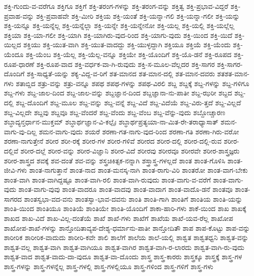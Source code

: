 {ಶಕ್ತಿ-ಗುಂದು-ವ-ವರೆಗೂ
ಶಕ್ತಿಗೂ
ಶಕ್ತಿಗೆ
ಶಕ್ತಿ-ತರಂಗ-ಗಳನ್ನು
ಶಕ್ತಿ-ತರಂಗ-ವನ್ನು
ಶಕ್ತಿತ್ವ
ಶಕ್ತಿ-ಪ್ರಭಾವ-ವಿದ್ದರೆ
ಶಕ್ತಿ-ಪ್ರವಾಹ-ವನ್ನು
ಶಕ್ತಿ-ಪ್ರವಾಹವೇ
ಶಕ್ತಿ-ಮೀರಿ
ಶಕ್ತಿಯ
ಶಕ್ತಿ-ಯಂತೆ
ಶಕ್ತಿ-ಯನ್ನಾ-ಗಲಿ
ಶಕ್ತಿ-ಯನ್ನಾ-ಗಲೀ
ಶಕ್ತಿ-ಯನ್ನು
ಶಕ್ತಿ-ಯನ್ನೂ
ಶಕ್ತಿ-ಯನ್ನೆಲ್ಲ
ಶಕ್ತಿ-ಯನ್ನೆಲ್ಲಾ
ಶಕ್ತಿ-ಯನ್ನೇ
ಶಕ್ತಿ-ಯನ್ನೇನೋ
ಶಕ್ತಿ-ಯಲ್ಲ
ಶಕ್ತಿ-ಯಲ್ಲಿ
ಶಕ್ತಿ-ಯಲ್ಲೆಲ್ಲ
ಶಕ್ತಿಯಾ
ಶಕ್ತಿ-ಯಾ-ಗಲೀ
ಶಕ್ತಿ-ಯಾಗಿ
ಶಕ್ತಿ-ಯಾಗಿರು-ವುದ-ರಿಂದ
ಶಕ್ತಿ-ಯಾಗು-ವುದು
ಶಕ್ತಿ-ಯಿಂದ
ಶಕ್ತಿ-ಯಿದೆ
ಶಕ್ತಿ-ಯಿಲ್ಲದ
ಶಕ್ತಿಯು
ಶಕ್ತಿ-ಯುತ-ವಾಗಿ
ಶಕ್ತಿ-ಯುತ-ವಾದದ್ದು
ಶಕ್ತಿ-ಯುಳ್ಳದ್ದಾಗಿ
ಶಕ್ತಿಯೂ
ಶಕ್ತಿಯೆ
ಶಕ್ತಿ-ಯೆಂದು
ಶಕ್ತಿ-ಯೆಂದೂ
ಶಕ್ತಿ-ಯೆಂಬ
ಶಕ್ತಿ-ಯೆಲ್ಲ
ಶಕ್ತಿ-ಯೆಲ್ಲ-ವನ್ನೂ
ಶಕ್ತಿಯೇ
ಶಕ್ತಿ-ಯೊಂದಿಗೆ
ಶಕ್ತಿ-ಯೊ-ಡನೆ
ಶಕ್ತಿ-ರೂಪದ
ಶಕ್ತಿ-ರೂಪ-ಧಾರಣೆ
ಶಕ್ತಿ-ರೂಪ-ವಾದ
ಶಕ್ತಿ-ವರ್ಧಕ-ವಾ-ಗಿ-ರುವುದು
ಶಕ್ತಿ-ಸ-ಮೂಲ-ವೆಲ್ಲದರ
ಶಕ್ತಿ-ಸಾಗರ
ಶಕ್ತಿ-ಸಾಗರ-ದೊಂದಿಗೆ
ಶಕ್ತಿ-ಸಾಧ್ಯತೆ-ಯನ್ನು
ಶಕ್ಯ-ವಿದ್ದ-ವ-ರಿಗೆ
ಶತ-ಮಾನದ
ಶತ-ಮಾನ-ದಲ್ಲಿ
ಶತ-ಮಾನ-ದವರು
ಶತಶತ-ಮಾನ-ಗಳು
ಶತಾಬ್ದಿದ
ಶತ್ರು-ವನ್ನು
ಶತ್ರು-ವನ್ನೂ
ಶಪಥ
ಶಪಥ-ಗಳನ್ನು
ಶಪಥ-ವಿರಲಿ
ಶಬ್ದ
ಶಬ್ದಕ್ಕೆ
ಶಬ್ದ-ಗಳನ್ನು
ಶಬ್ದ-ಗಳಿಗೂ
ಶಬ್ದ-ಗಳು
ಶಬ್ದ-ಜಾಲ-ದಿಂದ
ಶಬ್ದ-ಜಾಲ-ವನ್ನು
ಶಬ್ದಜ್ಞಾನ-ದಿಂದ
ಶಬ್ದಜ್ಞಾನಾ-ನು-ಪಾತೀ
ಶಬ್ದ-ಝರೀ
ಶಬ್ದದ
ಶಬ್ದ-ದಲ್ಲಿ
ಶಬ್ದ-ದೊಂದಿಗೆ
ಶಬ್ದ-ಮೂಲ
ಶಬ್ದ-ವನ್ನು
ಶಬ್ದ-ವನ್ನೆ
ಶಬ್ದ-ವಿದೆ
ಶಬ್ದ-ವಿದೆಯೆ
ಶಬ್ದ-ವಿರು-ತ್ತದೆ
ಶಬ್ದ-ವಿಲ್ಲದೆ
ಶಬ್ದ-ವಿಲ್ಲದೇ
ಶಬ್ದವು
ಶಬ್ದವೂ
ಶಬ್ದ-ವೆಂದರೆ
ಶಬ್ದ-ವೆಂದು
ಶಬ್ದ-ವೆಂಬ
ಶಬ್ದ-ವೆನ್ನು-ವುದು
ಶಬ್ದೋಚ್ಚಾರಣ
ಶಬ್ಧಾದ್ಯನ್ತರ್ಧಾನ-ಮುಕ್ತಮ್
ಶಬ್ಧಾರ್ಥಜ್ಞಾನ-ವಿ-ಕಲ್ಪೈಃ
ಶಬ್ಧಾರ್ಥಪ್ರತ್ಯಯಾ-ನಾ-ಮಿತ-ರೇ-ತರಾಧ್ಯಾಸಾತ್
ಶಮನ-ವಾಗು-ವು-ದಿಲ್ಲ
ಶಮನ-ವಾಗು-ವುದು
ಶಯರೆ
ಶರಣಾ-ಗತ-ನಾಗು-ವುದ-ರಿಂದ
ಶರಣಾ-ಗತಿ
ಶರಣಾ-ಗಿರು-ವರೋ
ಶರಣಾ-ನಾಗುತ್ತೇನೆ
ಶರೀರ
ಶರೀ-ರಕ್ಕೆ
ಶರೀರ-ಗಳ
ಶರೀರ-ಗಳಿವೆ
ಶರೀರದ
ಶರೀರ-ದಲ್ಲಿ
ಶರೀರ-ದಲ್ಲಿ-ರುವ
ಶರೀರ-ದಲ್ಲಿವೆ
ಶರೀರ-ದಲ್ಲೆ
ಶರೀರ-ವನ್ನು
ಶರೀರ-ವಿಜ್ಞಾನಿ
ಶರೀರ-ವಿದೆ
ಶರೀರವು
ಶರೀರವೂ
ಶರೀರವೇ
ಶರೀರ-ಶಾಸ್ತ್ರಜ್ಞರು
ಶರೀರ-ಶಾಸ್ತ್ರದ
ಶವಕ್ಕೆ
ಶವ-ದಂತೆ
ಶವ-ವನ್ನು
ಶಸ್ತ್ರಚಿಕಿತ್ಸಕ-ನನ್ನಾಗಿ
ಶಸ್ತ್ರಾಸ್ತ್ರ-ಗಳಲ್ಲದೆ
ಶಾಂತ
ಶಾಂತ-ಗೊಳಿಸಿ
ಶಾಂತ-ಜೀವಿ-ಗಳು
ಶಾಂತ-ನಾಗುತ್ತಾನೆ
ಶಾಂತ-ನಾದ
ಶಾಂತ-ಮನಸ್ಕ-ನಾಗಿ
ಶಾಂತ-ರಾಗು-ವಿರಿ
ಶಾಂತರೋ
ಶಾಂತ-ವಾಗ-ಬೇಕು
ಶಾಂತ-ವಾಗಿ
ಶಾಂತ-ವಾಗಿದ್ದಷ್ಟೂ
ಶಾಂತ-ವಾಗಿ-ರಲಿ
ಶಾಂತ-ವಾಗಿ-ರುವುದು
ಶಾಂತ-ವಾಗು-ವ-ವರೆಗೆ
ಶಾಂತ-ವಾಗು-ವುದು
ಶಾಂತ-ವಾಗು-ವುವು
ಶಾಂತ-ವಾದರೂ
ಶಾಂತ-ವಾದವು
ಶಾಂತ-ವಾದಾಗ
ಶಾಂತ-ವಾದೊ-ಡನೆ
ಶಾಂತವೂ
ಶಾಂತ-ಸಾಗರದ
ಶಾಂತಸ್ವಭಾ-ವದ-ವನು
ಶಾಂತಸ್ವಾ-ಭಾವ-ದವನು
ಶಾಂತಿ
ಶಾಂತಿ-ಗಾಗಿ
ಶಾಂತಿಗೆ
ಶಾಂತಿಯ
ಶಾಂತಿ-ಯನ್ನು
ಶಾಂತಿ-ಯಿಂದ
ಶಾಂತಿಯೂ
ಶಾಂತಿಯೆ
ಶಾಂತಿಯೇ
ಶಾಂತಿ-ಯೊಂದಿಗೆ
ಶಾಕಾ-ಹಾರಿ-ಗಳು
ಶಾಕೆ-ಯಿಂದ
ಶಾಖ
ಶಾಖಕ್ಕೆ
ಶಾಖದ
ಶಾಖ-ವಿದೆ
ಶಾಖ-ವಿಲ್ಲ-ದಂತೆಯೆ
ಶಾಖೆ
ಶಾಖೆ-ಗಳು
ಶಾಖೆಗೆ
ಶಾಖೆಯ
ಶಾಖೆ-ಯವ-ರೆಲ್ಲ
ಶಾಖೋಪ
ಶಾಖೋಪ-ಶಾಖೆ-ಗಳನ್ನು
ಶಾನ್ತೋದಿತಾವ್ಯಪ-ದೇಶ್ಯ-ಧರ್ಮಾನು-ಪಾತೀ
ಶಾನ್ತೋದಿತೌ
ಶಾಪ
ಶಾಪ-ಕೊಟ್ಟು
ಶಾಪ-ವನ್ನು
ಶಾರೀರಿಕ
ಶಾರೀರಿಕ-ವಾದುದು
ಶಾರೀರಿ-ಕವೇ
ಶಾಲಿ
ಶಾಲೆಗೆ
ಶಾಲೆಯ
ಶಾಲೆ-ಯಲ್ಲಿ
ಶಾಶ್ವತ
ಶಾಶ್ವತಧ್ವನಿ
ಶಾಶ್ವತ-ವನ್ನು
ಶಾಶ್ವತ-ವಲ್ಲ
ಶಾಶ್ವತ-ವಾಗಿ
ಶಾಶ್ವತ-ವಾಗಿಯೂ
ಶಾಶ್ವತ-ವಾಗಿರ
ಶಾಶ್ವತ-ವಾಗಿ-ರ-ಲಾರದು
ಶಾಶ್ವತ-ವಾಗಿ-ರು-ವುದು
ಶಾಶ್ವತ-ವಾದ
ಶಾಶ್ವತ-ವಾದು-ದಾ-ವುದೂ
ಶಾಶ್ವತ-ವಾ-ದೊಂದು
ಶಾಸ್ತ್ರ
ಶಾಸ್ತ್ರ-ಕಾರರು
ಶಾಸ್ತ್ರಕ್ಕೂ
ಶಾಸ್ತ್ರಕ್ಕೆ
ಶಾಸ್ತ್ರ-ಗಳ
ಶಾಸ್ತ್ರ-ಗಳನ್ನು
ಶಾಸ್ತ್ರ-ಗಳನ್ನೆಲ್ಲ
ಶಾಸ್ತ್ರ-ಗಳಲ್ಲಿ
ಶಾಸ್ತ್ರ-ಗಳಲ್ಲಿಯೂ
ಶಾಸ್ತ್ರ-ಗಳಿಂದ
ಶಾಸ್ತ್ರ-ಗಳಿಗೆ
ಶಾಸ್ತ್ರ-ಗಳು
}
